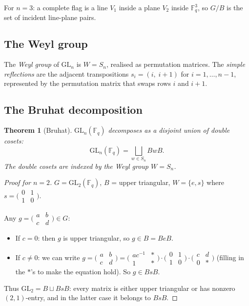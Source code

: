 \documentclass[12pt,a4paper]{article}
\newtheorem{theorem}{Theorem}[section]
\theoremstyle{definition}
\theoremstyle{remark}
\newcommand{\F}{\mathbb{F}}
\newcommand{\GL}{\mathrm{GL}}
\begin{document}
For $n = 3$: a complete flag is a line $V_1$ inside a plane $V_2$
inside $\F_q^3$, so $G/B$ is the set of incident line-plane pairs.

\subsection{The Weyl group}

The \emph{Weyl group} of $\GL_n$ is $W = S_n$, realised as
permutation matrices. The \emph{simple reflections} are the adjacent
transpositions $s_i = (i,\; i{+}1)$ for $i = 1, \ldots, n-1$,
represented by the permutation matrix that swaps rows $i$ and $i{+}1$.

\subsection{The Bruhat decomposition}

\begin{theorem}[Bruhat]\label{thm:bruhat}
$\GL_n(\F_q)$ decomposes as a disjoint union of double cosets:
\[
  \GL_n(\F_q) = \bigsqcup_{w \in S_n} BwB.
\]
The double cosets are indexed by the Weyl group $W = S_n$.
\end{theorem}

\begin{proof}[Proof for $n = 2$]
$G = \GL_2(\F_q)$, $B$ = upper triangular, $W = \{e, s\}$ where
$s = \bigl(\begin{smallmatrix} 0 & 1 \\ 1 & 0 \end{smallmatrix}\bigr)$.

Any $g = \bigl(\begin{smallmatrix} a & b \\ c & d \end{smallmatrix}\bigr) \in G$:
\begin{itemize}
\item If $c = 0$: then $g$ is upper triangular, so $g \in B = BeB$.
\item If $c \neq 0$: we can write
  $g = \bigl(\begin{smallmatrix} a & b \\ c & d \end{smallmatrix}\bigr)
  = \bigl(\begin{smallmatrix} ac^{-1} & * \\ 1 & * \end{smallmatrix}\bigr)
  \cdot \bigl(\begin{smallmatrix} 0 & 1 \\ 1 & 0 \end{smallmatrix}\bigr)
  \cdot \bigl(\begin{smallmatrix} c & d \\ 0 & * \end{smallmatrix}\bigr)$
  (filling in the $*$'s to make the equation hold). So $g \in BsB$.
\end{itemize}
Thus $\GL_2 = B \sqcup BsB$: every matrix is either upper triangular
or has nonzero $(2,1)$-entry, and in the latter case it belongs to
$BsB$.
\end{proof}
\end{document}
